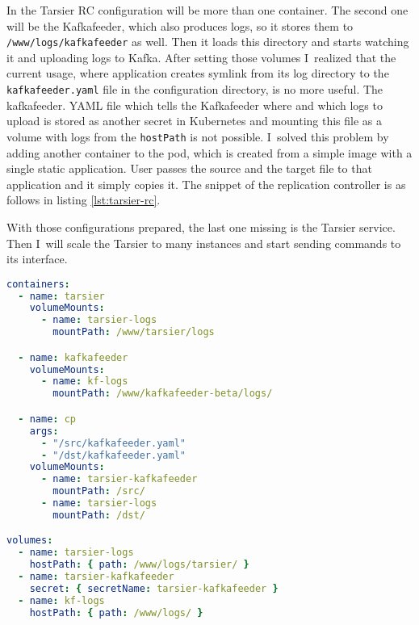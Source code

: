 In the Tarsier RC configuration will be more than one container. The second one will be the Kafkafeeder, which also produces logs, so it stores them to \lstinline{/www/logs/kafkafeeder} as well. Then it loads this directory and starts watching it and uploading logs to Kafka. After setting those volumes I~realized that the current usage, where application creates symlink from its log directory to the \lstinline{kafkafeeder.yaml} file in the configuration directory, is no more useful. The kafkafeeder. YAML file which tells the Kafkafeeder where and which logs to upload is stored as another secret in Kubernetes and mounting this file as a volume with logs from the \lstinline{hostPath} is not possible. I~solved this problem by adding another container to the pod, which is created from a simple image with a single static application. User passes the source and the target file to that application and it simply copies it. The snippet of the replication controller is as follows in listing \ref{lst:tarsier-rc}.

With those configurations prepared, the last one missing is the Tarsier service. Then I~will scale the Tarsier to many instances and start sending commands to its interface.

\newpage
\begin{lstlisting}[language=yaml,caption={Snippet of replication controller configuration},label={lst:tarsier-rc}]
containers:
  - name: tarsier
    volumeMounts:
      - name: tarsier-logs
        mountPath: /www/tarsier/logs

  - name: kafkafeeder
    volumeMounts:
      - name: kf-logs
        mountPath: /www/kafkafeeder-beta/logs/

  - name: cp
    args:
      - "/src/kafkafeeder.yaml"
      - "/dst/kafkafeeder.yaml"
    volumeMounts:
      - name: tarsier-kafkafeeder
        mountPath: /src/
      - name: tarsier-logs
        mountPath: /dst/

volumes:
  - name: tarsier-logs
    hostPath: { path: /www/logs/tarsier/ }
  - name: tarsier-kafkafeeder
    secret: { secretName: tarsier-kafkafeeder }
  - name: kf-logs
    hostPath: { path: /www/logs/ }
\end{lstlisting}
